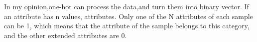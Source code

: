 \documentclass[a4paper,12pt]{article}
\begin{document}
      In my opinion,one-hot can process the data,and turn them into binary vector.
    If an attribute has n values, attributes. Only one of
    the N attributes of each sample can be 1, which means that the attribute of the
    sample belongs to this category, and the other extended attributes are 0.
\end{document}
